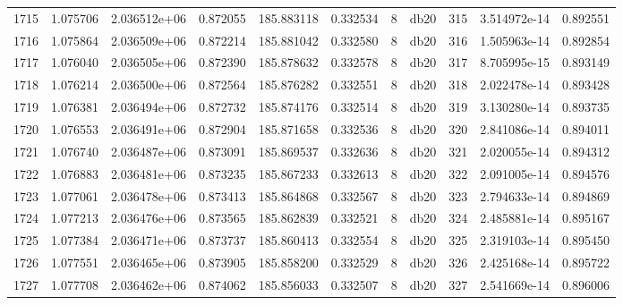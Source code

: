 \begin{tabular}{lrrrrrrlrrr}
1715 &    1.075706 &        2.036512e+06 &  0.872055 &              185.883118 &    0.332534 &       8 &         db20 &    315 &   3.514972e-14 &      0.892551 \\
1716 &    1.075864 &        2.036509e+06 &  0.872214 &              185.881042 &    0.332580 &       8 &         db20 &    316 &   1.505963e-14 &      0.892854 \\
1717 &    1.076040 &        2.036505e+06 &  0.872390 &              185.878632 &    0.332578 &       8 &         db20 &    317 &   8.705995e-15 &      0.893149 \\
1718 &    1.076214 &        2.036500e+06 &  0.872564 &              185.876282 &    0.332551 &       8 &         db20 &    318 &   2.022478e-14 &      0.893428 \\
1719 &    1.076381 &        2.036494e+06 &  0.872732 &              185.874176 &    0.332514 &       8 &         db20 &    319 &   3.130280e-14 &      0.893735 \\
1720 &    1.076553 &        2.036491e+06 &  0.872904 &              185.871658 &    0.332536 &       8 &         db20 &    320 &   2.841086e-14 &      0.894011 \\
1721 &    1.076740 &        2.036487e+06 &  0.873091 &              185.869537 &    0.332636 &       8 &         db20 &    321 &   2.020055e-14 &      0.894312 \\
1722 &    1.076883 &        2.036481e+06 &  0.873235 &              185.867233 &    0.332613 &       8 &         db20 &    322 &   2.091005e-14 &      0.894576 \\
1723 &    1.077061 &        2.036478e+06 &  0.873413 &              185.864868 &    0.332567 &       8 &         db20 &    323 &   2.794633e-14 &      0.894869 \\
1724 &    1.077213 &        2.036476e+06 &  0.873565 &              185.862839 &    0.332521 &       8 &         db20 &    324 &   2.485881e-14 &      0.895167 \\
1725 &    1.077384 &        2.036471e+06 &  0.873737 &              185.860413 &    0.332554 &       8 &         db20 &    325 &   2.319103e-14 &      0.895450 \\
1726 &    1.077551 &        2.036465e+06 &  0.873905 &              185.858200 &    0.332529 &       8 &         db20 &    326 &   2.425168e-14 &      0.895722 \\
1727 &    1.077708 &        2.036462e+06 &  0.874062 &              185.856033 &    0.332507 &       8 &         db20 &    327 &   2.541669e-14 &      0.896006 \\

\end{tabular}
